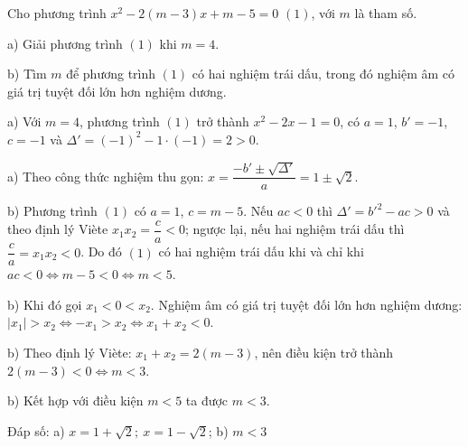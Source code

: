 \begin{problem}[9DS-PT2-017]
Cho phương trình $x^2 - 2(m - 3)x + m - 5 = 0$ $(1)$, với $m$ là tham số.

a) Giải phương trình $(1)$ khi $m = 4$.

b) Tìm $m$ để phương trình $(1)$ có hai nghiệm trái dấu, trong đó nghiệm âm có giá trị tuyệt đối lớn hơn nghiệm dương.

\begin{solution}
a) Với $m = 4$, phương trình $(1)$ trở thành $x^2 - 2x - 1 = 0$, có $a = 1$, $b' = -1$, $c = -1$ và $\Delta' = (-1)^2 - 1 \cdot (-1) = 2 > 0$.

a) Theo công thức nghiệm thu gọn: $x = \dfrac{-b' \pm \sqrt{\Delta'}}{a} = 1 \pm \sqrt{2}$.

b) Phương trình $(1)$ có $a = 1$, $c = m - 5$. Nếu $ac < 0$ thì $\Delta' = b'^2 - ac > 0$ và theo định lý Viète $x_1x_2 = \dfrac{c}{a} < 0$; ngược lại, nếu hai nghiệm trái dấu thì $\dfrac{c}{a} = x_1x_2 < 0$. Do đó $(1)$ có hai nghiệm trái dấu khi và chỉ khi $ac < 0 \Leftrightarrow m - 5 < 0 \Leftrightarrow m < 5$.

b) Khi đó gọi $x_1 < 0 < x_2$. Nghiệm âm có giá trị tuyệt đối lớn hơn nghiệm dương: $|x_1| > x_2 \Leftrightarrow -x_1 > x_2 \Leftrightarrow x_1 + x_2 < 0$.

b) Theo định lý Viète: $x_1 + x_2 = 2(m - 3)$, nên điều kiện trở thành $2(m - 3) < 0 \Leftrightarrow m < 3$.

b) Kết hợp với điều kiện $m < 5$ ta được $m < 3$.

Đáp số: a) $\boxed{x = 1 + \sqrt{2};\ x = 1 - \sqrt{2}}$; b) $\boxed{m < 3}$
\end{solution}
\end{problem}

